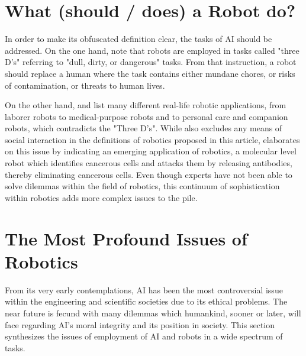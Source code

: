 \documentclass[man]{apa6}
\begin{document}
\section{What (should / does) a Robot do?}
In order to make its obfuscated definition clear, the tasks of AI should be addressed.
On the one hand,   note that robots are employed in tasks called "three D's" referring to "dull, dirty, or dangerous" tasks.
From that instruction, a robot should replace a human where the task contains either mundane chores, or risks of contamination, or threats to human lives.
\par 
\par
On the other hand,  and  list many different real-life robotic applications, from laborer robots to medical-purpose robots and to personal care and companion robots, which contradicts the "Three D's".
While  also excludes any means of social interaction in the definitions of robotics proposed in this article,  elaborates on this issue by indicating an emerging application of robotics, a molecular level robot which identifies cancerous cells and attacks them by releasing antibodies, thereby eliminating cancerous cells.
Even though experts have not been able to solve dilemmas within the field of robotics, this continuum of sophistication within robotics adds more complex issues to the pile.
\par
\section{The Most Profound Issues of Robotics}
From its very early contemplations, AI has been the most controversial issue within the engineering and scientific societies due to its ethical problems.
The near future is fecund with many dilemmas which humankind, sooner or later, will face regarding AI's moral integrity and its position in society.
This section synthesizes the issues of employment of AI and robots in a wide spectrum of tasks.
\end{document}
